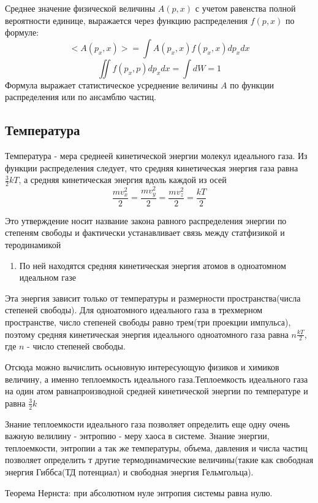 \documentclass{article}
\begin{document}
Среднее значение физической величины $A(p,x)$ с учетом равенства полной вероятности единице, выражается через функцию распределения $f(p,x)$ по формуле:
$$<A(p_x,x)> =\int A(p_x,x)f(p_x,x)dp_xdx$$
$$\iint f(p_x,p)dp_xdx = \int dW = 1$$
Формула выражает статистическое усреднение величины $A$ по функции распределения или по ансамблю частиц.

\subsection{Температура}

Температура - мера среднеей кинетической энергии молекул идеального газа. Из функции распределения следует, что средняя кинетическая энергия газа равна $\frac 32 kT$, а средняя кинетическая энергия вдоль каждой из осей $$\frac{mv_x^2}2=\frac{mv_y^2}2=\frac{mv_z^2}2 = \frac{kT}2$$

Это утверждение носит название закона равного распределения энергии по степеням свободы и фактически устанавливает связь между статфизикой и теродинамикой

\begin{enumerate}
 функция распределения Максвелла
\item По ней находятся средняя кинетическая энергия атомов в одноатомном идеальном газе
\end{enumerate}

Эта энергия зависит только от температуры и размерности пространства(числа степеней свободы). Для одноатомного идеального газа в трехмерном пространстве, число степеней свободы равно трем(три проекции импульса), поэтому средняя кинетическая энергия идеального одноатомного газа равна $n\frac{kT}2$, где $n$ - число степеней свободы. 

Отсюда можно вычислить осьновную интересующую физиков и химиков величину, а именно теплоемкость идеального газа.Теплоемкость идеального газа на один атом равнапроизводной средней кинетической энергии по температуре и равна $\frac 32 k$

Знание теплоемкости идеального газа позволяет определить еще одну очень важную велилину - энтропию - меру хаоса в системе. Знание энергии, теплоемкости, энтропии а так же температуры, объема, давления и числа частиц позволяет определить т другие термодинамические величины(такие как свободная энергия Гиббса(ТД потенциал) и свободная энергия Гельмгольца).

Теорема Нернста: при абсолютном нуле энтропия системы равна нулю.
\end{document}
